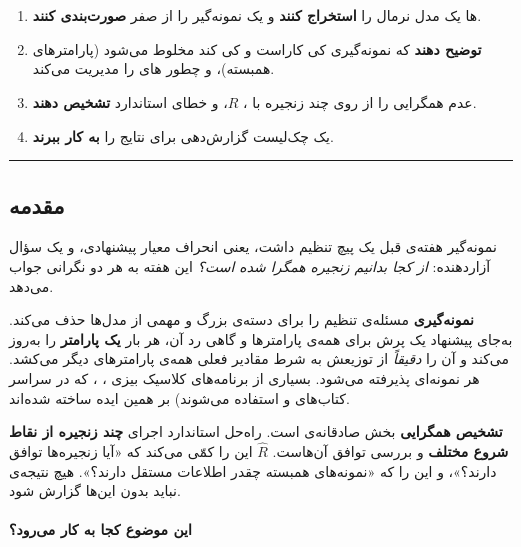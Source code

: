 \begin{enumerate}
\def\labelenumi{\arabic{enumi}.}
\tightlist
\item
  ها یک مدل نرمال  را
  \textbf{استخراج کنند} و یک نمونه‌گیر  را از صفر
  \textbf{صورت‌بندی کنند}.
\item
  \textbf{توضیح دهند} که نمونه‌گیری  کی کاراست و کی کند مخلوط
  می‌شود (پارامترهای همبسته)، و  چطور
  های  را مدیریت می‌کند.
\item
  عدم همگرایی را از روی چند زنجیره با ، \(\hat R\)،
   و خطای استاندارد  \textbf{تشخیص دهند}.
\item
  یک چک‌لیست گزارش‌دهی برای نتایج  را \textbf{به کار ببرند}.
\end{enumerate}

\begin{center}\rule{0.5\linewidth}{0.5pt}\end{center}

\subsection{مقدمه}

نمونه‌گیر  هفته‌ی قبل یک پیچ تنظیم داشت، یعنی انحراف معیار
پیشنهادی، و یک سؤال آزاردهنده: \emph{از کجا بدانیم زنجیره همگرا شده
است؟} این هفته به هر دو نگرانی جواب می‌دهد.

\textbf{نمونه‌گیری } مسئله‌ی تنظیم را برای دسته‌ی بزرگ و مهمی از
مدل‌ها حذف می‌کند. به‌جای پیشنهاد یک پرش برای همه‌ی پارامترها و گاهی رد آن،
هر بار \textbf{یک پارامتر} را به‌روز می‌کند و آن را \emph{دقیقاً} از توزیعش
به شرط مقادیر فعلی همه‌ی پارامترهای دیگر می‌کشد. هر نمونه‌ای پذیرفته می‌شود.
بسیاری از برنامه‌های کلاسیک بیزی ، ، که در سراسر
کتاب‌های  \lr{\&}  و  استفاده می‌شوند) بر
همین ایده ساخته شده‌اند.

\textbf{تشخیص همگرایی} بخش صادقانه‌ی  است. راه‌حل استاندارد اجرای
\textbf{چند زنجیره از نقاط شروع مختلف} و بررسی توافق آن‌هاست. \(\hat R\)
این را کمّی می‌کند که «آیا زنجیره‌ها توافق دارند؟»، و  این را که
«نمونه‌های همبسته چقدر اطلاعات مستقل دارند؟». هیچ نتیجه‌ی  نباید
بدون این‌ها گزارش شود.

\paragraph{این موضوع کجا به کار می‌رود؟}

